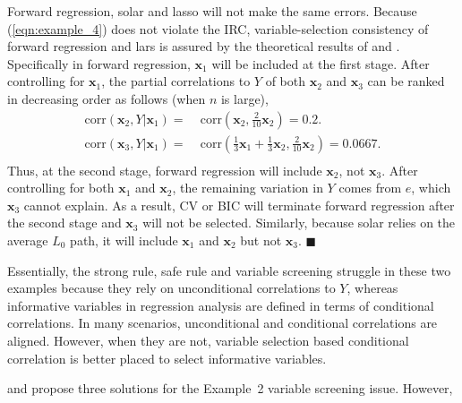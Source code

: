 \documentclass[12pt]{article}
\begin{document}
Forward regression, solar and lasso will not make the same errors. Because (\ref{eqn:example_4}) does not violate the IRC, variable-selection consistency of forward regression and lars is assured by the theoretical results of \citet{zhang09} and \citet{zhaoyu06}. Specifically in forward regression, $\mathbf{x}_1$ will be included  at the first stage. After controlling for $\mathbf{x}_1$, the partial correlations to $Y$ of both $\mathbf{x}_2$ and $\mathbf{x}_3$ can be ranked in decreasing order as follows (when $n$ is large),
%
\begin{equation}
  \begin{aligned}
    \mathrm{corr} \left( \mathbf{x}_2, Y \vert \mathbf{x}_1 \right)  = & \;\mathrm{corr} \left( \mathbf{x}_2, \frac{2}{10} \mathbf{x}_2 \right)
    = 0.2. \\
    \mathrm{corr} \left( \mathbf{x}_3, Y \vert \mathbf{x}_1 \right)  = & \;\mathrm{corr} \left( \frac{1}{3} \mathbf{x}_1 + \frac{1}{3} \mathbf{x}_2, \frac{2}{10} \mathbf{x}_2 \right)
    = 0.0667. \\
  \end{aligned}
\end{equation}
%
Thus, at the second stage, forward regression will include $\mathbf{x}_2$, not $\mathbf{x}_3$. After controlling for both $\mathbf{x}_1$ and $\mathbf{x}_2$, the remaining variation in $Y$ comes from $e$, which $\mathbf{x}_3$ cannot explain. As a result, CV or BIC will terminate forward regression after the second stage and $\mathbf{x}_3$ will not be selected. Similarly, because solar relies on the average $L_0$ path, it will include $\mathbf{x}_1$ and $\mathbf{x}_2$ but not $\mathbf{x}_3$. $\blacksquare$

\smallskip
Essentially, the strong rule, safe rule and variable screening struggle in these two examples because they rely on unconditional correlations to $Y$, whereas informative variables in regression analysis are defined in terms of conditional correlations. In many scenarios, unconditional and conditional correlations are aligned. However, when they are not, variable selection based conditional correlation is better placed to select informative variables.

\citet{fan2008sure} and \citet{barut2016conditional} propose three solutions for the Example~2 variable screening issue. However,
\end{document}
